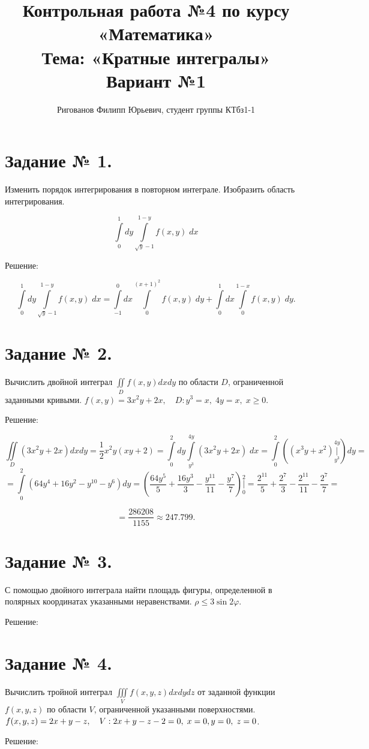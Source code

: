 \documentclass{article}
\title{Контрольная работа №4 по курсу «Математика»\\
Тема: «Кратные интегралы»\\
Вариант №1}
\author{Ригованов Филипп Юрьевич, студент группы КТбз1-1}
\renewcommand{\leq}{\ensuremath{\leqslant}}
\renewcommand{\geq}{\ensuremath{\geqslant}}
\begin{document}
\date{}
\maketitle
\section*{Задание № 1.}
Изменить порядок интегрирования в повторном интеграле. Изобразить область интегрирования.

$$\int\limits_{0}^{1} dy \int\limits_{\sqrt{y}-1}^{1-y} f(x,y)\;dx$$
\begin{center}Решение:\end{center}

$$\int\limits_{0}^{1} dy \int\limits_{\sqrt{y}-1}^{1-y} f(x,y)\;dx=\int\limits_{-1}^{0} dx \int\limits_{0}^{(x+1)^2} f(x,y)\;dy+\int\limits_{0}^{1} dx \int\limits_{0}^{1-x} f(x,y)\;dy.$$

\section*{Задание № 2.}
Вычислить двойной интеграл $\iint\limits_{D} f(x,y)dx dy$ по области $D$, ограниченной заданными кривыми. $f(x,y)=3x^2y+2x,\quad D: y^3=x,\; 4y=x,\; x\geq0$.
\begin{center}Решение:\end{center}

$$\iint\limits_{D} \left(3x^2y+2x\right) dx dy=\frac{1}{2}x^2 y (x y+2)=
\int\limits_{0}^{2} dy \int\limits_{y^3}^{4y} \left(3x^2y+2x\right)\;dx=
\int\limits_{0}^{2} \left(\left(x^3y+x^2\right)\bigg|\limits_{y^3}^{4y}\right) dy =$$
$$= \int\limits_{0}^{2} \left( 64y^4+16y^2-y^{10}-y^6\right) dy = \left(\frac{64y^5}{5}+\frac{16y^3}{3}-\frac{y^{11}}{11}-\frac{y^7}{7}\right)\bigg|\limits_{0}^{2} = \frac{2^{11}}{5}+\frac{2^7}{3}-\frac{2^{11}}{11}-\frac{2^7}{7}=$$

$$=\frac{286208}{1155}\approx247.799.$$

\section*{Задание № 3.}
С помощью двойного интеграла найти площадь фигуры, определенной в полярных координатах указанными неравенствами. $\rho\leq 3\sin{2\varphi}$.
\begin{center}Решение:\end{center}


\section*{Задание № 4.}
 Вычислить тройной интеграл $\iiint\limits_{V} f(x,y,z)dx dy dz$ от заданной функции $f(x,y,z)$ по области $V$, ограниченной указанными поверхностями.
 $f(x,y,z)=2x+y-z,\quad V: 2x+y-z-2=0,\;x=0,\;\\y=0,\;z=0$.
 \begin{center}Решение:\end{center}
\end{document}
